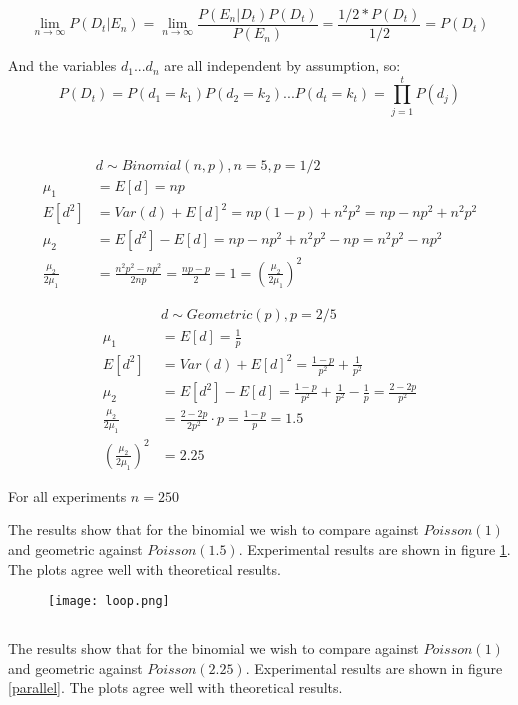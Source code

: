 \documentclass{article}
\begin{document}
$$ \lim_{n\to\infty} P(D_t | E_n) = \lim_{n\to\infty} \frac{P(E_n | D_t)P(D_t)}{P(E_n)} = \frac{1/2* P(D_t)}{1/2} = P(D_t) $$

And the variables $d_1...d_n$ are all independent by assumption, so:
$$P(D_t) = P(d_1 = k_1) P(d_2 = k_2) ... P(d_t = k_t) = \prod_{j=1}^{t} P(d_j)$$ 

\section{}
\subsection{}
$$
\begin{aligned}
&d\sim Binomial(n,p),n=5,p=1/2\\
\mu_1&=E[d]=np\\
E[d^2]&=Var(d)+E[d]^2=np(1-p)+n^2p^2=np-np^2+n^2p^2\\
\mu_2&=E[d^2]-E[d]=np-np^2+n^2p^2-np=n^2p^2-np^2\\
\frac{\mu_2}{2\mu_1}&=\frac{n^2p^2-np^2}{2np}=\frac{np-p}{2}=1=(\frac{\mu_2}{2\mu_1})^2
\end{aligned}
$$

$$
\begin{aligned}
&d\sim Geometric(p),p=2/5\\
\mu_1&=E[d]=\frac{1}{p}\\
E[d^2]&=Var(d)+E[d]^2=\frac{1-p}{p^2}+\frac{1}{p^2}\\
\mu_2&=E[d^2]-E[d]=\frac{1-p}{p^2}+\frac{1}{p^2}-\frac{1}{p}=\frac{2-2p}{p^2}\\
\frac{\mu_2}{2\mu_1}&=\frac{2-2p}{2p^2}\cdot p=\frac{1-p}{p}=1.5\\
(\frac{\mu_2}{2\mu_1})^2&=2.25
\end{aligned}
$$

For all experiments $n=250$

The results show that for the binomial we wish to compare against $Poisson(1)$ and geometric against $Poisson(1.5)$. Experimental results are shown in figure \ref{loop}. The plots agree well with theoretical results.

\begin{figure}[!ht]
	\centering
	\texttt{[image: loop.png]}
	\label{loop}
\end{figure}

\subsection{}
\vspace{-2ex}
The results show that for the binomial we wish to compare against $Poisson(1)$ and geometric against $Poisson(2.25)$. Experimental results are shown in figure \ref{parallel}. The plots agree well with theoretical results.
\end{document}
